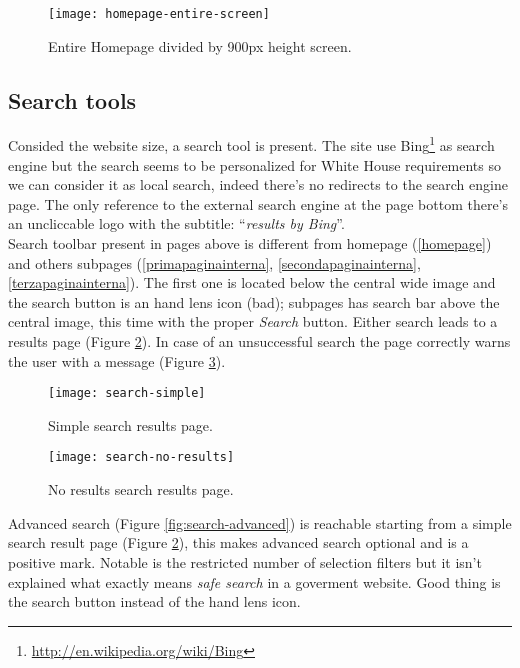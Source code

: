 \documentclass[
10pt, %
a4paper, %
oneside, %
headinclude,footinclude, %
BCOR5mm, %
]{scrartcl}
\begin{document}
	\begin{figure}[h]
	\centering 
	\centerline{\texttt{[image: homepage-entire-screen]}}
	\caption[Screen divided homepage]{Entire Homepage divided by 900px height screen.}
	\label{fig:entirehomepage} 
	\end{figure}

	\subsection{Search tools}
	\label{searchtools}
	Consided the website size, a search tool is present. The site use Bing\footnote{\href{http://en.wikipedia.org/wiki/Bing}{http://en.wikipedia.org/wiki/Bing}} as search engine but the search seems to be personalized for White House requirements so we can consider it as local search, indeed there's no redirects to the search engine page. The only reference to the external search engine at the page bottom there's an uncliccable logo with the subtitle: ``\emph{results by Bing}''. \\
	Search toolbar present in pages above is different from homepage (\ref{homepage}) and others subpages (\ref{primapaginainterna}, \ref{secondapaginainterna}, \ref{terzapaginainterna}). The first one is located below the central wide image and the search button is an hand lens icon (bad); subpages has search bar above the central image, this time with the proper \emph{Search} button. Either search leads to a results page (Figure \ref{fig:search-simple}). In case of an unsuccessful search the page correctly warns the user with a message (Figure \ref{fig:search-no-results}).

	\begin{figure}[h]
	\centering 
	\centerline{\texttt{[image: search-simple]}}
	\caption[Simple search results page]{Simple search results page.}
	\label{fig:search-simple} 
	\end{figure}

	\begin{figure}[h]
	\centering 
	\centerline{\texttt{[image: search-no-results]}}
	\caption[No results search results page]{No results search results page.}
	\label{fig:search-no-results} 
	\end{figure}

	Advanced search (Figure \ref{fig:search-advanced}) is reachable starting from a simple search result page (Figure \ref{fig:search-simple}), this makes advanced search optional and is a positive mark. Notable is the restricted number of selection filters but it isn't explained what exactly means \emph{safe search} in a goverment website. Good thing is the search button instead of the hand lens icon.
\end{document}
